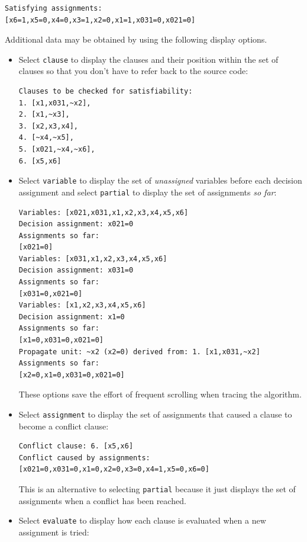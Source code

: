 \documentclass[11pt]{report}
\newcommand*{\p}[1]{\textup{\texttt{#1}}}
\begin{document}
\begin{verbatim}
Satisfying assignments:
[x6=1,x5=0,x4=0,x3=1,x2=0,x1=1,x031=0,x021=0]
\end{verbatim}

Additional data may be obtained by using the following display options.

\begin{itemize}

\item Select \p{clause} to display the clauses and their position within
the set of clauses so that you don't have to refer back to the source
code:

\begin{verbatim}
Clauses to be checked for satisfiability:
1. [x1,x031,~x2],
2. [x1,~x3],
3. [x2,x3,x4],
4. [~x4,~x5],
5. [x021,~x4,~x6],
6. [x5,x6]
\end{verbatim}

\item Select \p{variable} to display the set of \emph{unassigned}
variables before each decision assignment and select \p{partial} to
display the set of assignments \emph{so far}:

\begin{verbatim}
Variables: [x021,x031,x1,x2,x3,x4,x5,x6]
Decision assignment: x021=0
Assignments so far:
[x021=0]
Variables: [x031,x1,x2,x3,x4,x5,x6]
Decision assignment: x031=0
Assignments so far:
[x031=0,x021=0]
Variables: [x1,x2,x3,x4,x5,x6]
Decision assignment: x1=0
Assignments so far:
[x1=0,x031=0,x021=0]
Propagate unit: ~x2 (x2=0) derived from: 1. [x1,x031,~x2]
Assignments so far:
[x2=0,x1=0,x031=0,x021=0]
\end{verbatim}

These options save the effort of frequent scrolling when tracing the
algorithm.

\item Select \p{assignment} to display the set of assignments that caused a
clause to become a conflict clause:
\begin{verbatim}
Conflict clause: 6. [x5,x6]
Conflict caused by assignments:
[x021=0,x031=0,x1=0,x2=0,x3=0,x4=1,x5=0,x6=0]
\end{verbatim}
This is an alternative to selecting \p{partial} because it just displays
the set of assignments when a conflict has been reached.

\item Select \p{evaluate} to display how each clause is evaluated when a
new assignment is tried:


\end{itemize}
\end{document}
